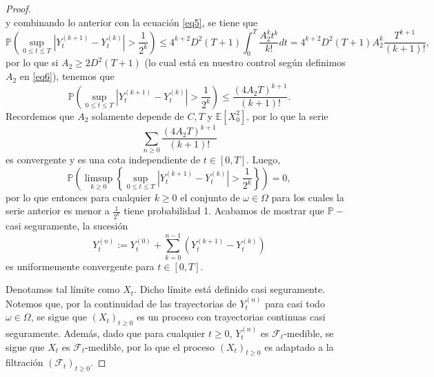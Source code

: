 \documentclass[letterpaper]{article}
\newcommand{\F}{\mathcal{F}}
\newcommand{\E}{\mathbb{E}}
\renewcommand{\P}{\mathbb{P}}
\newcommand{\1}{\mathds{1}}
\theoremstyle{definition}
\theoremstyle{definition}
\theoremstyle{definition}
\theoremstyle{definition}
\theoremstyle{definition}
\begin{document}
\begin{enumerate}
\begin{proof}
\[            \]
            y combinando lo anterior con la ecuación \eqref{eq5}, se tiene que 
            \[
                \P\left(\sup_{0\leq t\leq T}|Y_t^{(k+1)}-Y_t^{(k)}|>\frac{1}{2^{k}}\right)\leq 4^{k+2}D^2(T+1)\int_{0}^{T}\frac{A_2^{k}t^{k}}{k!}dt=4^{k+2}D^2(T+1)A_2^{k}\frac{T^{k+1}}{(k+1)!},
            \]
            por lo que si $A_2\geq2D^2(T+1)$ (lo cual está en nuestro control según definimos $A_2$ en \eqref{eq6}), tenemos que 
            \[
                \P\left(\sup_{0\leq t\leq T}|Y_t^{(k+1)}-Y_t^{(k)}|>\frac{1}{2^{k}}\right)\leq \frac{(4A_2T)^{k+1}}{(k+1)!}.
            \]
            Recordemos que $A_2$ solamente depende de $C,T$ y $\E\left[X_0^2\right]$, por lo que 
            la serie 
            \[
                \sum_{n\geq0}\frac{(4A_2T)^{k+1}}{(k+1)!}
            \]
            es convergente y es una cota independiente de $t\in [0,T]$. Luego, 
            \[
            \P\left(\limsup_{k\geq0}\left\{\sup_{0\leq t\leq T}|Y_t^{(k+1)}-Y_t^{(k)}|>\frac{1}{2^{k}}\right\}\right)=0,    
            \]
            por lo que entonces para cualquier $k\geq0$ el conjunto de $\omega\in\Omega$ para los cuales la serie anterior es menor a $\frac{1}{2^{k}}$ tiene 
            probabilidad 1. Acabamos de mostrar que $\P-$casi seguramente, la sucesión 
            \[
            Y_t^{(n)}:=Y_t^{(0)}+\sum_{k=0}^{n-1}(Y_t^{(k+1)}-Y^{(k)}_t)
            \]
            es uniformemente convergente para $t\in[0,T]$. 
            
            Denotamos tal límite como $X_t$. Dicho límite está definido casi seguramente. Notemos que, por la continuidad de las trayectorias de $Y_t^{(n)}$ para 
            casi todo $\omega\in\Omega$, se sigue que $(X_t)_{t\geq0}$ es un proceso con trayectorias continuas casi seguramente. Además, dado que para cualquier 
            $t\geq0$, $Y_t^{(n)}$ es $\F_t$-medible, se sigue que $X_t$ es $\F_t$-medible, por lo que el proceso 
            $(X_t)_{t\geq0}$ es adaptado a la filtración $(\F_t)_{t\geq0}$.


\end{proof}
\end{enumerate}
\end{document}

